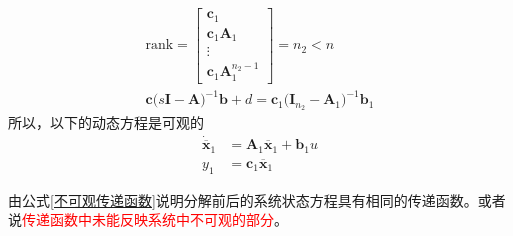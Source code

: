 \begin{align}
	\text{rank} = 
	\begin{bmatrix}
		\bm{c}_1 \\ 
		\bm{c}_1\bm{A}_1\\
		\vdots \\
		\bm{c}_1 \bm{A}_1^{n_2-1}
	\end{bmatrix}
	= n_2 < n\\[0.5em]
	\bm{c}\big(s\bm{I}-\bm{A}\big)^{-1}\bm{b} + d = \bm{c}_1 \big(\bm{I}_{n_2} - \bm{A}_1\big)^{-1}\bm{b}_1
	\label{不可观传递函数}
\end{align}
所以，以下的动态方程是可观的
\begin{align}
	\dot{\overline{\bm{x}}}_1 &= \bm{A}_1 \overline{\bm{x}}_1 + \bm{b}_1 u\\
	y_1 & = \bm{c}_1 \overline{\bm{x}}_1
\end{align}

由公式\eqref{不可观传递函数}说明分解前后的系统状态方程具有相同的传递函数。或者说\textcolor{red}{传递函数中未能反映系统中不可观的部分}。


